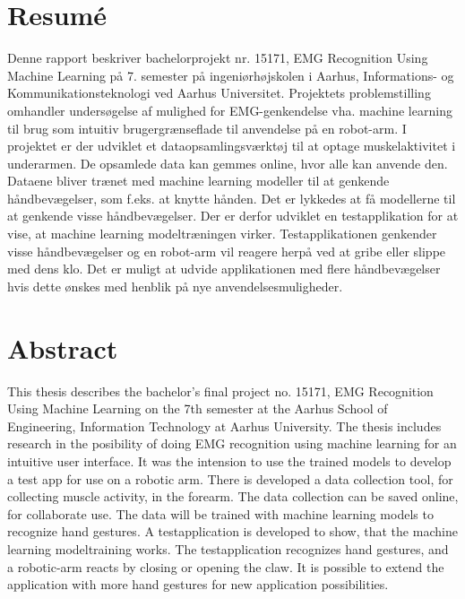 \thispagestyle{fancy}
\vfill
\section*{Resumé}
\label{sec:resume}
Denne rapport beskriver bachelorprojekt nr. 15171, EMG Recognition Using Machine Learning på 7. semester på ingeniørhøjskolen i Aarhus, Informations- og Kommunikationsteknologi ved Aarhus Universitet. Projektets problemstilling omhandler undersøgelse af mulighed for EMG-genkendelse vha. machine learning til brug som intuitiv brugergrænseflade til anvendelse på en robot-arm. I projektet er der udviklet et dataopsamlingsværktøj til at optage muskelaktivitet i underarmen. De opsamlede data kan gemmes online, hvor alle kan anvende den. Dataene bliver trænet med machine learning modeller til at genkende håndbevægelser, som f.eks. at knytte hånden. Det er lykkedes at få modellerne til at genkende visse håndbevægelser. Der er derfor udviklet en testapplikation for at vise, at machine learning modeltræningen virker. Testapplikationen genkender visse håndbevægelser og en robot-arm vil reagere herpå ved at gribe eller slippe med dens klo. Det er muligt at udvide applikationen med flere håndbevægelser hvis dette ønskes med henblik på nye anvendelsesmuligheder.

\vfill

\section*{Abstract}
\label{sec:abstract}
This thesis describes the bachelor's final project no. 15171, EMG Recognition Using Machine Learning on the 7th semester at the Aarhus School of Engineering, Information Technology at Aarhus University. The thesis includes research in the posibility of doing EMG recognition using machine learning for an intuitive user interface. It was the intension to use the trained models to develop a test app for use on a robotic arm. There is developed a data collection tool, for collecting muscle activity, in the forearm. The data collection can be saved online, for collaborate use. The data will be trained with machine learning models to recognize hand gestures. A testapplication is developed to show, that the machine learning modeltraining works. The testapplication recognizes hand gestures, and a robotic-arm reacts by closing or opening the claw. It is possible to extend the application with more hand gestures for new application possibilities.
\vfill